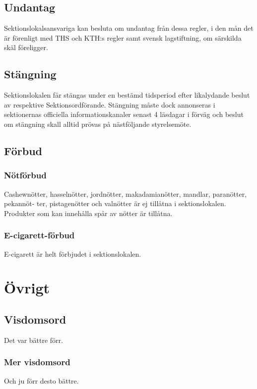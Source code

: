 \documentclass{dgovdoc}
\begin{document}
\subsection{Undantag}

Sektionslokalsansvariga kan besluta om undantag från dessa regler, i den mån
det är förenligt med THS och KTH:s regler samt svensk lagstiftning, om
särskilda skäl föreligger.

\subsection{Stängning}
\label{sec:sektionslokal-stangning}

Sektionslokalen får stängas under en bestämd tidsperiod efter likalydande
beslut av respektive Sektionsordförande. Stängning måste dock annonseras i
sektionernas officiella informationskanaler senast 4 läsdagar i förväg och
beslut om stängning skall alltid prövas på nästföljande styrelsemöte.

\subsection{Förbud}

\subsubsection{Nötförbud}
Cashewnötter, hasselnötter, jordnötter, makadamianötter, mandlar, paranötter, pekannöt-
ter, pistagenötter och valnötter är ej tillåtna i sektionslokalen. Produkter som kan innehålla
spår av nötter är tillåtna.

\subsubsection{E-cigarett-förbud}
E-cigarett är helt förbjudet i sektionslokalen.

\section{Övrigt}

\subsection{Visdomsord}

Det var bättre förr.

\subsubsection{Mer visdomsord}

Och ju förr desto bättre.
\end{document}
